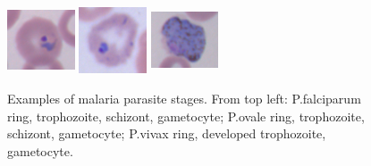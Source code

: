 \documentclass[final,a4paper,12pt,english]{UnicaPhdThesis3}
\begin{document}
\begin{figure}[t]
	\includegraphics[width=2cm, height=2cm]{images/malaria/vivax_1_ring}
	\includegraphics[width=2cm, height=2cm]{images/malaria/vivax_2c_trophozoiteDeveloped}
	\includegraphics[width=2cm, height=2cm]{images/malaria/vivax_4_gametocyte}
	\caption{\label{fig6_malaria_stages}Examples of malaria parasite stages. From top left: P.falciparum ring, trophozoite, schizont, gametocyte;
		P.ovale ring, trophozoite, schizont, gametocyte; P.vivax ring, developed trophozoite, gametocyte. \cite{Loddo2018}}
\end{figure}
\end{document}
